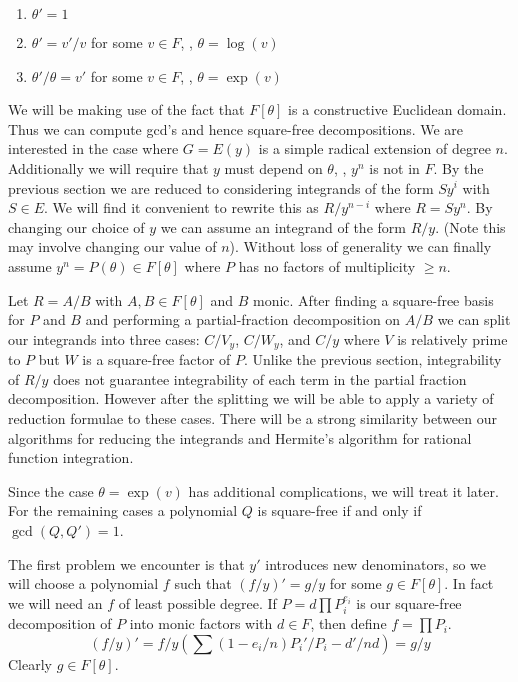 \begin{enumerate}
\item $\theta' = 1$
\item $\theta' = {v'} / v$  for some $v \in F$, \ie, 
$\theta = \log(v)$
\item ${\theta' / \theta} = v'$ for some $v \in F$,
\ie, $\theta = \exp(v)$
\end{enumerate}

\noindent
We will be making use of the fact that $F[ \theta ]$ is a constructive
Euclidean domain.  Thus we can compute gcd's and hence square-free
decompositions.  We are interested in the case where $G=E(y)$ is a 
simple radical extension of degree $n$.  Additionally we will require
that $y$ must depend on $\theta$, \ie, $y^n$ is not in $F$.  By the
previous section we are reduced to considering integrands of the form 
$S y^i$ with $S \in E$.  We will find it convenient to rewrite
this as $R / y^{n-i}$ where $R = S y^n$.  By changing
our choice of $y$ we can assume an integrand of the form $R / y$.
(Note this may involve changing our value of $n$).
Without loss of generality we can finally assume $y^n = P ( \theta ) 
\in F [ \theta ]$ where $P$ has no factors of multiplicity $\ge n$.

Let $R = A / B$ with $A , B \in F[ \theta ]$ and $B$ monic.
After finding a square-free basis for $P$ and $B$ and performing
a partial-fraction decomposition on $A / B$ we can split
our integrands into three cases: $C / {V_ y}$, $C / {W_ y}$,
and $C / y$ where $V$ is relatively prime
to $P$ but $W$ is a square-free factor of $P$.  Unlike the previous section,
integrability of $R / y$ does not guarantee integrability of each
term in the partial fraction decomposition.  However after the splitting
we will be able to apply a variety of reduction formulae to these cases.
There will be a strong similarity between our algorithms for reducing the
integrands and Hermite's algorithm for rational function integration.

Since the case $\theta = \exp(v)$
has additional complications, we will treat it later.  
For the remaining cases a polynomial $Q$ is square-free if and only if
$\gcd(Q,Q')=1$. 

The first problem we encounter is that $y'$ introduces new
denominators, so we will choose a polynomial $f$ such that
$(f/y)' = g / y$ for some $g \in F [ \theta ]$.  In fact we will 
need an $f$ of least possible degree.  If $P = d \prod P_i^{e_i}$ is
our square-free decomposition of $P$ into monic factors with $d \in
F$, then define $f = \prod P_i$.
\[
(f / y)' = f / y \left ( \sum (1-e_i / n) P_i' / P_i
- d' / nd  \right ) = g / y
\]
Clearly $g \in F [ \theta ]$.

